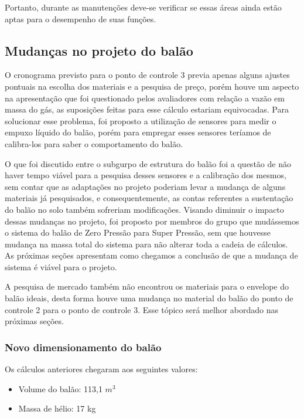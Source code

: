 	Portanto, durante as manutenções deve-se verificar se essas áreas ainda estão aptas para o desempenho de suas funções.


\subsection{Mudanças no projeto do balão}

O cronograma previsto para o ponto de controle 3 previa apenas alguns ajustes pontuais na escolha dos materiais e a pesquisa de preço, porém houve um aspecto na apresentação que foi questionado pelos avaliadores com relação a vazão em massa do gás, as suposições feitas para esse cálculo estariam equivocadas. Para solucionar esse problema, foi proposto a utilização de sensores para medir o empuxo líquido do balão, porém para empregar esses sensores teríamos de calibra-los para saber o comportamento do balão.

O que foi discutido entre o subgurpo de estrutura do balão foi a questão de não haver tempo viável para a pesquisa desses sensores e a calibração dos mesmos, sem contar que  as adaptações no projeto poderiam levar a mudança de alguns materiais já pesquisados, e consequentemente, as contas referentes a sustentação do balão no solo também sofreriam modificações. Visando diminuir o impacto dessas mudanças no projeto, foi proposto por membros do grupo que mudássemos o sistema do balão de Zero Pressão para Super Pressão, sem que houvesse mudança na massa total do sistema para não alterar toda a cadeia de cálculos. As próximas seções apresentam como chegamos a conclusão de que a mudança de sistema é viável para o projeto.

A pesquisa de mercado também não encontrou os materiais para o envelope do balão ideais, desta forma houve uma mudança no material do balão do ponto de controle 2 para o ponto de controle 3. Esse tópico será melhor abordado nas próximas seções.

\subsubsection{Novo dimensionamento do balão}

Os cálculos anteriores chegaram aos seguintes valores:
\begin{itemize}
	\item Volume do balão: 113,1 $m^3$
	\item Massa de hélio: 17 kg
\end{itemize}


